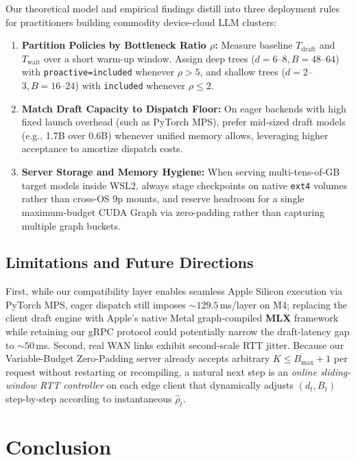 \documentclass[10pt,conference]{IEEEtran}
\begin{document}
Our theoretical model and empirical findings distill into three deployment rules for practitioners building commodity device-cloud LLM clusters:
\begin{enumerate}
  \item \textbf{Partition Policies by Bottleneck Ratio $\rho$:} Measure baseline $T_{\mathrm{draft}}$ and $T_{\mathrm{wait}}$ over a short warm-up window. Assign deep trees ($d{=}6$--$8, B{=}48$--$64$) with \texttt{proactive=included} whenever $\rho > 5$, and shallow trees ($d{=}2$--$3, B{=}16$--$24$) with \texttt{included} whenever $\rho \le 2$.
  \item \textbf{Match Draft Capacity to Dispatch Floor:} On eager backends with high fixed launch overhead (such as PyTorch MPS), prefer mid-sized draft models (e.g., 1.7B over 0.6B) whenever unified memory allows, leveraging higher acceptance to amortize dispatch costs.
  \item \textbf{Server Storage and Memory Hygiene:} When serving multi-tens-of-GB target models inside WSL2, always stage checkpoints on native \texttt{ext4} volumes rather than cross-OS 9p mounts, and reserve headroom for a single maximum-budget CUDA Graph via zero-padding rather than capturing multiple graph buckets.
\end{enumerate}

\subsection{Limitations and Future Directions}

First, while our compatibility layer enables seamless Apple Silicon execution via PyTorch MPS, eager dispatch still imposes $\sim 129.5$\,ms/layer on M4; replacing the client draft engine with Apple's native Metal graph-compiled \textbf{MLX} framework while retaining our gRPC protocol could potentially narrow the draft-latency gap to $\sim 50$\,ms. Second, real WAN links exhibit second-scale RTT jitter. Because our Variable-Budget Zero-Padding server already accepts arbitrary $K \le B_{\max}+1$ per request without restarting or recompiling, a natural next step is an \emph{online sliding-window RTT controller} on each edge client that dynamically adjusts $(d_t, B_t)$ step-by-step according to instantaneous $\hat{\rho}_t$.

\section{Conclusion}
\end{document}
